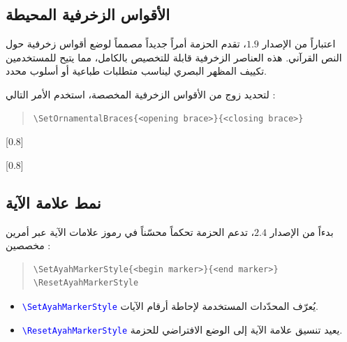 \documentclass[12pt,a4paper]{article}
\newcommand{\cmd}[1]{\textenglish{\textcolor{blue}{\texttt{\textbackslash #1}}}}
\begin{document}
\subsection{الأقواس الزخرفية المحيطة}

اعتباراً من الإصدار $1.9$، تقدم الحزمة أمراً جديداً مصمماً لوضع أقواس زخرفية حول النص القرآني.
هذه العناصر الزخرفية قابلة للتخصيص بالكامل، مما يتيح للمستخدمين تكييف المظهر البصري ليناسب متطلبات طباعية أو أسلوب محدد.

لتحديد زوج من الأقواس الزخرفية المخصصة، استخدم الأمر التالي :

\begin{english}
\begin{quote}
\begin{lstlisting}[style=BashInputStyle]
\SetOrnamentalBraces{<opening brace>}{<closing brace>}
\end{lstlisting}
\end{quote}
\end{english}

\begin{center}
\centerline{[0.8\textwidth]}

\vspace{1cm}

\centerline{[0.8\textwidth]}
\end{center}

\subsection{نمط علامة الآية}

بدءاً من الإصدار $2.4$، تدعم الحزمة تحكماً محسّناً في رموز علامات الآية عبر أمرين مخصصين :

\begin{english}
\begin{quote}
\begin{lstlisting}[style=BashInputStyle]
\SetAyahMarkerStyle{<begin marker>}{<end marker>}
\ResetAyahMarkerStyle
\end{lstlisting}
\end{quote}
\end{english}

\begin{itemize}
    \item \cmd{SetAyahMarkerStyle} يُعرّف المحدّدات المستخدمة لإحاطة أرقام الآيات.
    \item \cmd{ResetAyahMarkerStyle} يعيد تنسيق علامة الآية إلى الوضع الافتراضي للحزمة.
\end{itemize}
\end{document}
